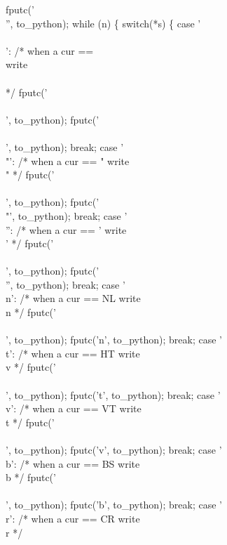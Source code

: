   fputc('\\'', to_python);
  while (n) \{
    switch(*s) \{
      case '\\\\':                /* when a cur == \\ write \\\\ */
        fputc('\\\\', to_python);
        fputc('\\\\', to_python);
        break;
      case '\\"':                /* when a cur == " write \\" */
        fputc('\\\\', to_python);
        fputc('\\"', to_python);
        break;
      case '\\'':                /* when a cur == ' write \\' */
        fputc('\\\\', to_python);
        fputc('\\'', to_python);
        break;
      case '\\n':                /* when a cur == NL write \\n */
        fputc('\\\\', to_python);
        fputc('n', to_python);
        break;
      case '\\t':                /* when a cur == HT write \\v */
        fputc('\\\\', to_python);
        fputc('t', to_python);
        break;
      case '\\v':                /* when a cur == VT write \\t */
        fputc('\\\\', to_python);
        fputc('v', to_python);
        break;
      case '\\b':                /* when a cur == BS write \\b */
        fputc('\\\\', to_python);
        fputc('b', to_python);
        break;
      case '\\r':                /* when a cur == CR write \\r */
